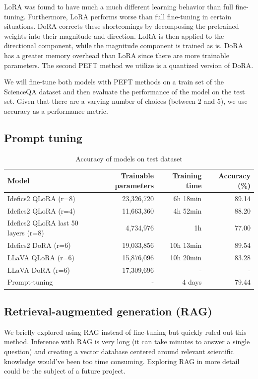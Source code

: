 \documentclass{article}
\begin{document}
LoRA was found to have much a much different learning behavior than full fine-tuning. Furthermore, LoRA performs worse than full fine-tuning in certain situations. DoRA corrects these shortcomings by decomposing the pretrained weights into their magnitude and direction. LoRA is then applied to the directional component, while the magnitude component is trained as is. DoRA has a greater memory overhead than LoRA since there are more trainable parameters. The second PEFT method we utilize is a quantized version of DoRA.\par

We will fine-tune both models with PEFT methods on a train set of the ScienceQA dataset and then evaluate the performance of the model on the test set. Given that there are a varying number of choices (between 2 and 5), we use accuracy as a performance metric.

\subsection{Prompt tuning}

\begin{table}[t]
  \centering
  \begin{tabular}{lrrr}
    \hline
    Model & Trainable parameters & Training time & Accuracy (\%)\\ 
    \hline
    Idefics2 QLoRA (r=8) & 23,326,720 & 6h 18min & 89.14\\ 
    Idefics2 QLoRA (r=4) & 11,663,360 & 4h 52min & 88.20\\ 
    Idefics2 QLoRA last 50 layers (r=8) & 4,734,976 & 1h & 77.00\\
    Idefics2 DoRA (r=6) & 19,033,856 & 10h 13min & 89.54\\
    LLaVA QLoRA (r=6) & 15,876,096 & 10h 20min & 83.28\\
    LLaVA DoRA (r=6) & 17,309,696 & - & -\\
    Prompt-tuning & - & 4 days & 79.44\\
    \hline
  \end{tabular}
  \caption{Accuracy of models on test dataset}
  \label{tab:model_performance}
\end{table}

\subsection{Retrieval-augmented generation (RAG)}
We briefly explored using RAG instead of fine-tuning but quickly ruled out this method. Inference with RAG is very long (it can take minutes to answer a single question) and creating a vector database centered around relevant scientific knowledge would've been too time consuming. Exploring RAG in more detail could be the subject of a future project.
\end{document}
